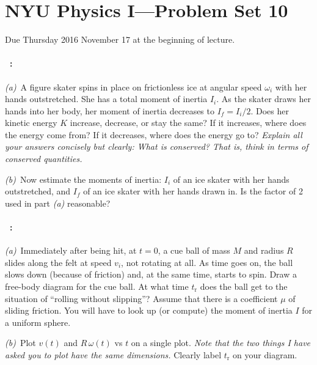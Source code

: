 \documentclass[12pt]{article}
\begin{document}
\section*{NYU Physics I---Problem Set 10}

Due Thursday 2016 November 17 at the beginning of lecture.

\paragraph{\problemname~\theproblem:}%
\textsl{(a)}~A figure skater spins in place on frictionless ice at
angular speed $\omega_i$ with her hands outstretched.  She has a total
moment of inertia $I_i$.  As the skater draws her hands into her body,
her moment of inertia decreases to $I_f=I_i/2$.  Does her kinetic
energy $K$ increase, decrease, or stay the same?  If it increases,
where does the energy come from?  If it decreases, where does the
energy go to?  \emph{Explain all your answers concisely but clearly:
What is conserved? That is, think in terms of conserved quantities.}

\textsl{(b)}~Now estimate the moments of inertia: $I_i$ of an ice
skater with her hands outstretched, and $I_f$ of an ice skater with
her hands drawn in.  Is the factor of 2 used in part \textsl{(a)}
reasonable?

\paragraph{\problemname~\theproblem:}%
\textsl{(a)}~Immediately after being hit, at $t=0$, a cue ball of mass
$M$ and radius $R$ slides along the felt at speed $v_i$, not rotating
at all.  As time goes on, the ball slows down (because of friction)
and, at the same time, starts to spin.  Draw a free-body diagram for
the cue ball.  At what time $t_\mathrm{r}$ does the ball get to the
situation of ``rolling without slipping''?  Assume that there is a
coefficient $\mu$ of sliding friction. You will have to look up (or
compute) the moment of inertia $I$ for a uniform sphere.

\textsl{(b)}~Plot $v(t)$ and $R\,\omega(t)$ vs $t$ on a single plot.
\emph{Note that the two things I have asked you to plot have the same
dimensions.}  Clearly label $t_\mathrm{r}$ on your diagram.
\end{document}
